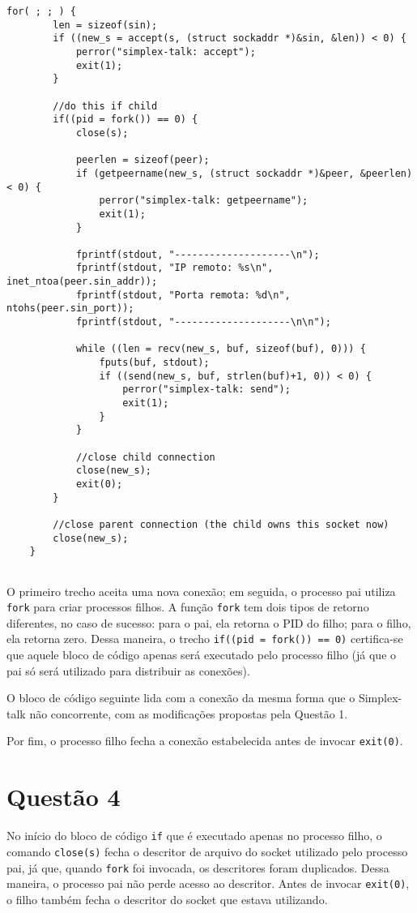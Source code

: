 \documentclass[a4paper,10pt]{article}
\begin{document}
\begin{lstlisting}
for( ; ; ) {
        len = sizeof(sin);
        if ((new_s = accept(s, (struct sockaddr *)&sin, &len)) < 0) {
            perror("simplex-talk: accept");
            exit(1);
        }

        //do this if child
        if((pid = fork()) == 0) {
            close(s);

            peerlen = sizeof(peer);
            if (getpeername(new_s, (struct sockaddr *)&peer, &peerlen) < 0) {
                perror("simplex-talk: getpeername");
                exit(1);
            }

            fprintf(stdout, "--------------------\n");
            fprintf(stdout, "IP remoto: %s\n", inet_ntoa(peer.sin_addr));
            fprintf(stdout, "Porta remota: %d\n", ntohs(peer.sin_port));
            fprintf(stdout, "--------------------\n\n");

            while ((len = recv(new_s, buf, sizeof(buf), 0))) {
                fputs(buf, stdout);
                if ((send(new_s, buf, strlen(buf)+1, 0)) < 0) {
                    perror("simplex-talk: send");
                    exit(1);
                }
            }

            //close child connection
            close(new_s);
            exit(0);
        }

        //close parent connection (the child owns this socket now)
        close(new_s);
    }
    
\end{lstlisting}

O primeiro trecho aceita uma nova conexão; em seguida, o processo pai utiliza {\tt fork} para criar processos filhos. A função {\tt fork} tem dois tipos de retorno diferentes, no caso de sucesso: para o pai, ela retorna o PID do filho; para o filho, ela retorna zero. Dessa maneira, o trecho {\tt if((pid = fork()) == 0)} certifica-se que aquele bloco de código apenas será executado pelo processo filho (já que o pai só será utilizado para distribuir as conexões).

O bloco de código seguinte lida com a conexão da mesma forma que o Simplex-talk não concorrente, com as modificações propostas pela Questão 1.

Por fim, o processo filho fecha a conexão estabelecida antes de invocar {\tt exit(0)}.

\section{Questão 4}
No início do bloco de código {\tt if} que é executado apenas no processo filho, o comando {\tt close(s)} fecha o descritor de arquivo do socket utilizado pelo processo pai, já que, quando {\tt fork} foi invocada, os descritores foram duplicados. Dessa maneira, o processo pai não perde acesso ao descritor. Antes de invocar {\tt exit(0)}, o filho também fecha o descritor do socket que estava utilizando.
\end{document}
